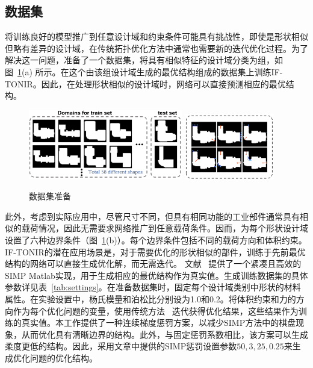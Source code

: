 \subsection{数据集}
将训练良好的模型推广到任意设计域和约束条件可能具有挑战性，即使是形状相似但略有差异的设计域，在传统拓扑优化方法中通常也需要新的迭代优化过程。为了解决这一问题，准备了一个数据集，将具有相似特征的设计域分类为组，如图~\ref{fig:datasets}(a) 所示。在这个由该组设计域生成的最优结构组成的数据集上训练IF-TONIR。因此，在处理形状相似的设计域时，网络可以直接预测相应的最优结构。

\begin{figure}[t]
    \centering
    \includegraphics[width=0.6\textwidth]{./figures/TONIR/domains_set.png}
    \hspace{0.2cm}
    \includegraphics[width=0.35\textwidth]{./figures/TONIR/bd_types.png}
    \\
    \hspace{0.2cm}
    \caption{数据集准备}
    \label{fig:datasets}
\end{figure}

此外，考虑到实际应用中，尽管尺寸不同，但具有相同功能的工业部件通常具有相似的载荷情况，因此无需要求网络推广到任意载荷条件。因而，为每个形状设计域设置了六种边界条件（图~\ref{fig:datasets}(b)）。每个边界条件包括不同的载荷方向和体积约束。IF-TONIR的潜在应用场景是，对于需要优化的形状相似的部件，训练于先前最优结构的网络可以直接生成优化解，而无需迭代。
文献~\cite{ferrari2020} 提供了一个紧凑且高效的SIMP Matlab实现，用于生成相应的最优结构作为真实值。生成训练数据集的具体参数详见表~\ref{tab:settings}。在准备数据集时，固定每个设计域类别中形状的材料属性。在实验设置中，杨氏模量和泊松比分别设为1.0和0.2。将体积约束和力的方向作为每个优化问题的变量，使用传统方法~\cite{ferrari2020} 迭代获得优化结果，这些结果作为训练的真实值。本工作提供了一种连续梯度惩罚方案，以减少SIMP方法中的棋盘现象，从而优化具有清晰边界的结构。此外，与固定惩罚系数相比，该方案可以生成柔度更低的结构。因此，采用文章中提供的SIMP惩罚设置参数${50,3,25,0.25}$来生成优化问题的优化结构。

